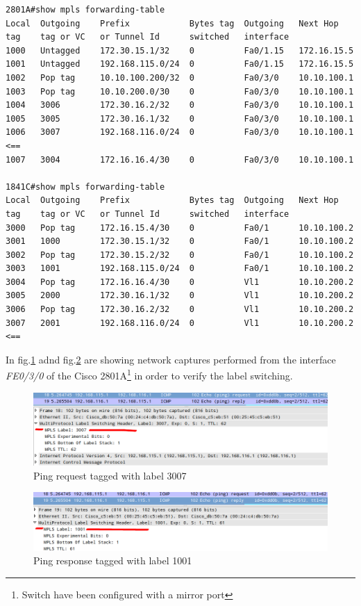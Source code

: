 \documentclass{llncs}
\begin{document}
\lstset{language=sh, caption=MPLS forwarding table of Cisco 2801A and 1841C, basicstyle=\ttfamily\scriptsize , breaklines=true}
\begin{lstlisting}
2801A#show mpls forwarding-table 
Local  Outgoing    Prefix            Bytes tag  Outgoing   Next Hop    
tag    tag or VC   or Tunnel Id      switched   interface              
1000   Untagged    172.30.15.1/32    0          Fa0/1.15   172.16.15.5  
1001   Untagged    192.168.115.0/24  0          Fa0/1.15   172.16.15.5  
1002   Pop tag     10.10.100.200/32  0          Fa0/3/0    10.10.100.1  
1003   Pop tag     10.10.200.0/30    0          Fa0/3/0    10.10.100.1  
1004   3006        172.30.16.2/32    0          Fa0/3/0    10.10.100.1  
1005   3005        172.30.16.1/32    0          Fa0/3/0    10.10.100.1  
1006   3007        192.168.116.0/24  0          Fa0/3/0    10.10.100.1  <==
1007   3004        172.16.16.4/30    0          Fa0/3/0    10.10.100.1  

1841C#show mpls forwarding-table 
Local  Outgoing    Prefix            Bytes tag  Outgoing   Next Hop    
tag    tag or VC   or Tunnel Id      switched   interface              
3000   Pop tag     172.16.15.4/30    0          Fa0/1      10.10.100.2  
3001   1000        172.30.15.1/32    0          Fa0/1      10.10.100.2  
3002   Pop tag     172.30.15.2/32    0          Fa0/1      10.10.100.2  
3003   1001        192.168.115.0/24  0          Fa0/1      10.10.100.2  
3004   Pop tag     172.16.16.4/30    0          Vl1        10.10.200.2  
3005   2000        172.30.16.1/32    0          Vl1        10.10.200.2  
3006   Pop tag     172.30.16.2/32    0          Vl1        10.10.200.2  
3007   2001        192.168.116.0/24  0          Vl1        10.10.200.2  <==
\end{lstlisting}

In fig.\ref{fig:mpl1_ping1} adnd fig.\ref{fig:mpl1_ping2} are showing network captures performed from the interface \emph{FE0/3/0} of the Cisco 2801A\footnote{Switch have been configured with a mirror port} in order to verify the label switching.

\begin{figure}
\centering
\includegraphics[width=1.0\textwidth]{../e3/ping.png}
\caption{Ping request tagged with label 3007}
\label{fig:mpl1_ping1}
\end{figure}
\begin{figure}
\centering
\includegraphics[width=1.0\textwidth]{../e3/pong.png}
\caption{Ping response tagged with label 1001}
\label{fig:mpl1_ping2}
\end{figure}
\end{document}
